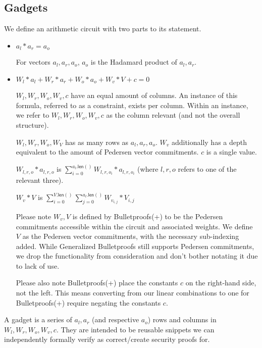 \documentclass[]{article}
\begin{document}
\newpage

\subsection{Gadgets}

We define an arithmetic circuit with two parts to its statement.

\begin{itemize}
	\item
	$a_l * a_r = a_o$
	
	For vectors $a_l, a_r, a_o$, $a_o$ is the Hadamard product of $a_l, a_r$.
	\item
	$W_l * a_l + W_r * a_r + W_o * a_o + W_v * V + c = 0$
	
	$W_l, W_r, W_o, W_v, c$ have an equal amount of columns. An instance of this formula, referred to as a constraint, exists per column. Within an instance, we refer to $W_l, W_r, W_o, W_v, c$ as the column relevant (and not the overall structure).
	
	$W_l, W_r, W_o, W_V$ has as many rows as $a_l, a_r, a_o$. $W_v$ additionally has a depth equivalent to the amount of Pedersen vector commitments. $c$ is a single value.
	
    $W_{l,r,o} * a_{l,r,o}$ is $\sum^{a_l\mathsf{.len}()}_{i=0} W_{l,r,o_i} * a_{l,r,o_i}$ (where $l,r,o$ refers to one of the relevant three).
	
	$W_v * V$ is $\sum^{V\mathsf{.len}()}_{i=0} \sum^{a_l\mathsf{.len}()}_{j=0} W_{v_{i, j}} * V_{i, j}$

	Please note $W_v, V$ is defined by Bulletproofs(+) to be the Pedersen commitments accessible within the circuit and associated weights. We define $V$ as the Pedersen vector commitments, with the necessary sub-indexing added. While Generalized Bulletproofs still supports Pedersen commitments, we drop the functionality from consideration and don't bother notating it due to lack of use.
	
	Please also note Bulletproofs(+) place the constants $c$ on the right-hand side, not the left. This means converting from our linear combinations to one for Bulletproofs(+) require negating the constants $c$.
\end{itemize}

A gadget is a series of $a_l, a_r$ (and respective $a_o$) rows and columns in $W_l, W_r, W_o, W_v, c$. They are intended to be reusable snippets we can independently formally verify as correct/create security proofs for.

\newcommand{\p}{\mathsf{.push}}
\newcommand{\al}{a_l\p}
\newcommand{\ar}{a_r\p}
\newcommand{\aol}{\mathsf{a_o.last()}}
\end{document}
